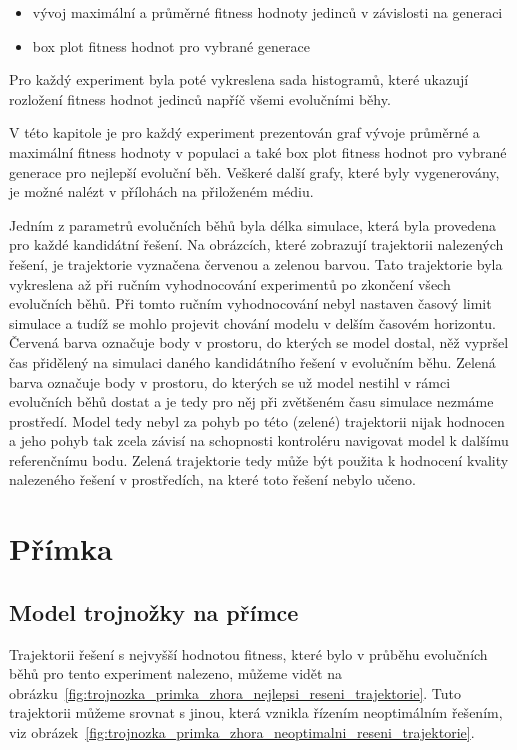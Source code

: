 \begin{itemize}
    \item vývoj maximální a průměrné fitness hodnoty jedinců v závislosti na generaci
    \item box plot fitness hodnot pro vybrané generace
\end{itemize}

Pro každý experiment byla poté vykreslena sada histogramů, které ukazují rozložení fitness hodnot jedinců napříč všemi evolučními běhy.

V této kapitole je pro každý experiment prezentován graf vývoje průměrné a maximální fitness hodnoty v populaci a také box plot fitness hodnot pro vybrané generace pro nejlepší evoluční běh.
Veškeré další grafy, které byly vygenerovány, je možné nalézt v přílohách na přiloženém médiu.

Jedním z parametrů evolučních běhů byla délka simulace, která byla provedena pro každé kandidátní řešení.
Na obrázcích, které zobrazují trajektorii nalezených řešení, je trajektorie vyznačena červenou a zelenou barvou.
Tato trajektorie byla vykreslena až při ručním vyhodnocování experimentů po zkončení všech evolučních běhů.
Při tomto ručním vyhodnocování nebyl nastaven časový limit simulace a tudíž se mohlo projevit chování modelu v delším časovém horizontu.
Červená barva označuje body v prostoru, do kterých se model dostal, něž vypršel čas přidělený na simulaci daného kandidátního řešení v evolučním běhu.
Zelená barva označuje body v prostoru, do kterých se už model nestihl v rámci evolučních běhů dostat a je tedy pro něj při zvětšeném času simulace nezmáme prostředí.
Model tedy nebyl za pohyb po této (zelené) trajektorii nijak hodnocen a jeho pohyb tak zcela závisí na schopnosti kontroléru navigovat model k dalšímu referenčnímu bodu.
Zelená trajektorie tedy může být použita k hodnocení kvality nalezeného řešení v prostředích, na které toto řešení nebylo učeno.

\section{Přímka}

\subsection{Model trojnožky na přímce}
Trajektorii řešení s nejvyšší hodnotou fitness, které bylo v průběhu evolučních běhů pro tento experiment nalezeno, můžeme vidět na obrázku~\ref{fig:trojnozka_primka_zhora_nejlepsi_reseni_trajektorie}.
Tuto trajektorii můžeme srovnat s jinou, která vznikla řízením neoptimálním řešením, viz obrázek~\ref{fig:trojnozka_primka_zhora_neoptimalni_reseni_trajektorie}.


